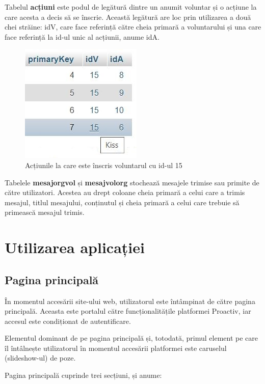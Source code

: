 \documentclass[12pt,a4paper]{report}
\begin{document}
\par
Tabelul \textbf{acțiuni} este podul de legătură dintre un anumit voluntar și o acțiune la care acesta a decis să se înscrie. Această legătură are loc prin utilizarea a două chei străine: idV, care face referință către cheia primară a voluntarului și una care face referință la id-ul unic al acțiunii, anume idA.
\\
\begin{figure}[H]
\centering
  \includegraphics[width=0.4\linewidth]{./imagini/actiuni.jpg}
  \caption{Acțiunile la care este înscris voluntarul cu id-ul 15}
\end{figure}

\par
Tabelele \textbf{mesajorgvol} și \textbf{mesajvolorg} stochează mesajele trimise sau primite de către utilizatori. Acestea au drept coloane cheia primară a celui care a trimis mesajul, titlul mesajului, conținutul și cheia primară a celui care trebuie să primească mesajul trimis.


\chapter{Utilizarea aplicației}
\section{Pagina principală}
\par
În momentul accesării site-ului web, utilizatorul este întâmpinat de către pagina principală. Aceasta este portalul către funcționalitățile platformei Proactiv, iar accesul este condiționat de autentificare.
\\\par
Elementul dominant de pe pagina principală și, totodată, primul element pe care îl întâlnește utilizatorul în momentul accesării platformei este caruselul (slideshow-ul) de poze. 
\\\par
Pagina principală cuprinde trei secțiuni, și anume:
\par
\end{document}
